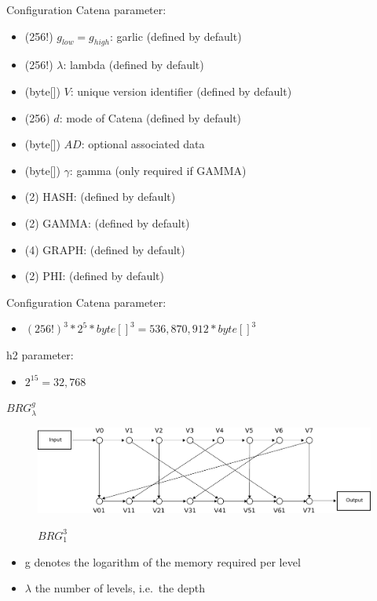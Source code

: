 \documentclass[11pt,aspectratio=169]{beamer}
\begin{document}
\begin{frame}{Configuration}
  Catena parameter:
  \begin{itemize}
    \item (256!) $g_{low}=g_{high}$: garlic (defined by default)
    \item (256!) $\lambda$: lambda (defined by default)
    
    \item (byte[]) $V$: unique version identifier (defined by default)
    \item (256) $d$: mode of Catena (defined by default)
    \item (byte[]) $AD$: optional associated data

    \item (byte[]) $\gamma$: gamma (only required if GAMMA)
    \item (2) HASH: (defined by default)
    \item (2) GAMMA: (defined by default)
    \item (4) GRAPH: (defined by default)
    \item (2) PHI: (defined by default)
  \end{itemize}
\end{frame}

\begin{frame}{Configuration}
  Catena parameter:
  \begin{itemize}
    \item $(256!)^3 * 2^5 * byte[] ^ 3 = 536,870,912 * byte[] ^ 3$
  \end{itemize}
  h2 parameter:
  \begin{itemize}
    \item $2^{15} = 32,768$
  \end{itemize}
\end{frame}

\begin{frame}{$BRG^g_\lambda$}
  \begin{minipage}[H]{0.48\linewidth}
    \begin{figure}
      \includegraphics[width=\textwidth]{images/brg_3-eps-converted-to.pdf}\\
        \caption{$BRG^3_1$}
    \end{figure}
  \end{minipage}
  \hfill%
  \begin{minipage}[H]{0.48\linewidth}
    \begin{itemize}
      \item g denotes the logarithm of the memory required per level
      \item $\lambda$ the number of levels, i.e.\ the depth
    \end{itemize}
  \end{minipage}
\end{frame}
\end{document}

